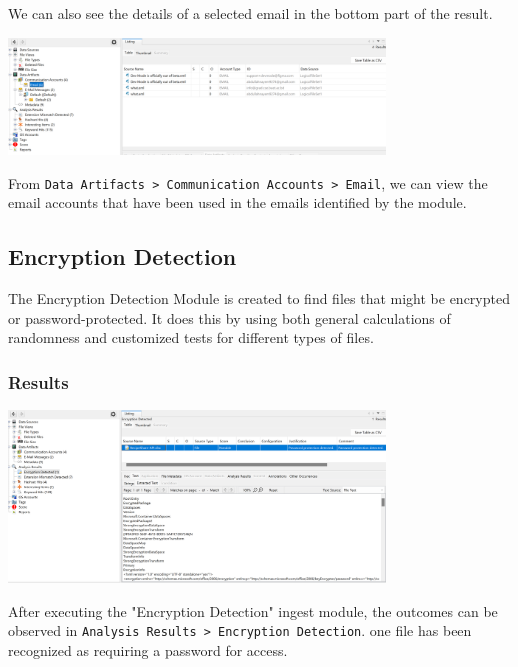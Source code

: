 \documentclass{extarticle}
\begin{document}
We can also see the details of a selected email in the bottom part of the result.
\begin{center}
    \includegraphics[width=0.75\textwidth]{3/3.9/Email Accounts.png}
\end{center}
From \texttt{Data Artifacts > Communication Accounts > Email}, we can view the email accounts that have been used in the emails identified by the module.

\subsection{Encryption Detection}
The Encryption Detection Module is created to find files that might be encrypted or password-protected. It does this by using both general calculations of randomness and customized tests for different types of files.

\subsubsection*{Results}
\begin{center}
    \includegraphics[width=0.75\textwidth]{3/3.10/Results of Encryption Detection ingest module.png}
\end{center}

After executing the "Encryption Detection" ingest module, the outcomes can be observed in \texttt{Analysis Results > Encryption Detection}. one file has been recognized as requiring a password for access.
\end{document}
